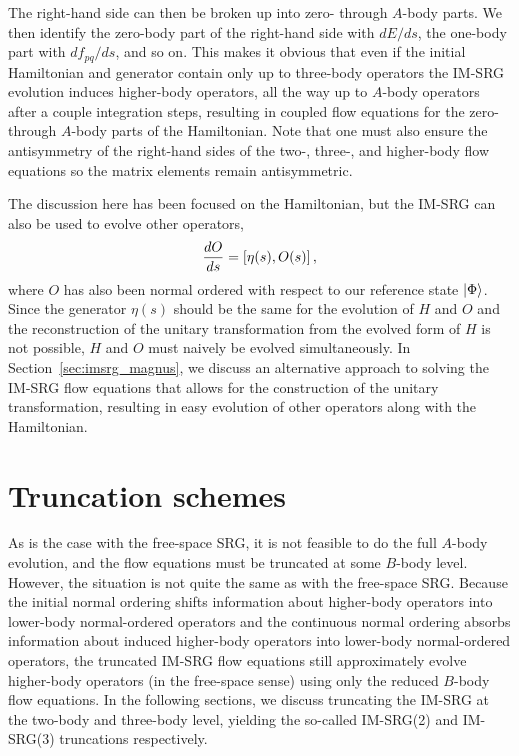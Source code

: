 The right-hand side can then be broken up into zero- through $A$-body parts.
We then identify the zero-body part of the right-hand side with $dE/ds$,
the one-body part with $df_{pq}/ds$, and so on.
This makes it obvious that
even if the initial Hamiltonian and generator contain only up to three-body operators
the IM-SRG evolution induces higher-body operators,
all the way up to $A$-body operators after a couple integration steps,
resulting in coupled flow equations for the zero- through $A$-body parts
of the Hamiltonian.
Note that one must also ensure the antisymmetry of the right-hand sides of the two-,
three-, and higher-body flow equations
so the matrix elements remain antisymmetric.

The discussion here has been focused on the Hamiltonian,
but the IM-SRG can also be used to evolve other operators,
\begin{equation}
  \frac{dO}{ds} = [\eta(s), O(s)]\,,
\end{equation}
where $O$ has also been normal ordered with respect to our reference state $\ket{\Phi}$.
Since the generator $\eta(s)$ should be the same for the evolution of $H$ and $O$
and the reconstruction of the unitary transformation from the evolved form of $H$
is not possible,
$H$ and $O$ must naively be evolved simultaneously.
In Section~\ref{sec:imsrg_magnus}, we discuss an alternative approach to solving the IM-SRG flow equations
that allows for the construction of the unitary transformation,
resulting in easy evolution of other operators along with the Hamiltonian.

\section{Truncation schemes}

As is the case with the free-space SRG,
it is not feasible to do the full $A$-body evolution,
and the flow equations must be truncated at some $B$-body level.
However, the situation is not quite the same as with the free-space SRG.\@
Because the initial normal ordering shifts information about higher-body operators
into lower-body normal-ordered operators
and the continuous normal ordering absorbs information about induced higher-body operators
into lower-body normal-ordered operators,
the truncated IM-SRG flow equations still approximately evolve higher-body operators
(in the free-space sense)
using only the reduced $B$-body flow equations.
In the following sections,
we discuss truncating the IM-SRG at the two-body and three-body level,
yielding the so-called IM-SRG(2) and IM-SRG(3) truncations respectively.

